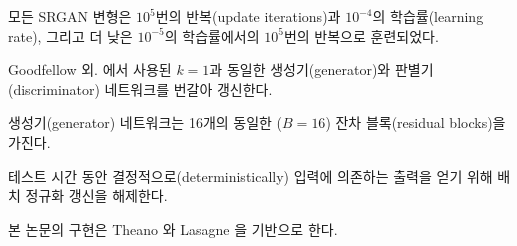 \documentclass[10pt,twocolumn,letterpaper]{article}
\newcommand{\kor}[1]{#1}
\newcommand{\eng}[1]{}
\newcommand{\summary}[1]{}
\begin{document}
\eng{
All SRGAN variants were trained with $10^5$ update iterations at a learning rate of $10^{-4}$ and another $10^5$ iterations at a lower rate of $10^{-5}$.
}\kor{
모든 SRGAN 변형은 $10^5$번의 반복(update iterations)과 $10^{-4}$의 학습률(learning rate), 그리고 더 낮은 $10^{-5}$의 학습률에서의 $10^5$번의 반복으로 훈련되었다.
}
\eng{
We alternate updates to the generator and discriminator network, which is equivalent to $k=1$ as used in Goodfellow et al. \cite{Goodfellow14GAN}.
}\kor{
Goodfellow 외. \cite{Goodfellow14GAN}에서 사용된 $k=1$과 동일한 생성기(generator)와 판별기(discriminator) 네트워크를 번갈아 갱신한다.
} \eng{
Our generator network has 16 identical ($B=16$) residual blocks.
}\kor{
생성기(generator) 네트워크는 16개의 동일한 ($B=16$) 잔차 블록(residual blocks)을 가진다.
} \eng{
During test time we turn batch-normalization update off to obtain an output that deterministically depends only on the input \cite{Ioffe2015}.
}\kor{
테스트 시간 동안 결정적으로(deterministically) 입력\cite{Ioffe2015}에 의존하는 출력을 얻기 위해 배치 정규화 갱신을 해제한다.
} \eng{
Our implementation is based on Theano \cite{theano2016} and Lasagne \cite{lasagne2015}.
}\kor{
본 논문의 구현은 Theano \cite{theano2016}와 Lasagne \cite{lasagne2015}을 기반으로 한다.
}

\summary{
ImageNet 데이터베이스에서 무작위 샘플 350,000개를 사용하여 SRResNet 및 SRGAN 모델을 훈련시켰으며, 최적화를 위해 Adam $\beta_1=0.9$을 사용하였음. 생성기와 판별기 네트워크는 번갈아 갱신했으며, 생성기 네트워크의 구조는 16개의 잔차 블록을 가짐.
}
\end{document}
